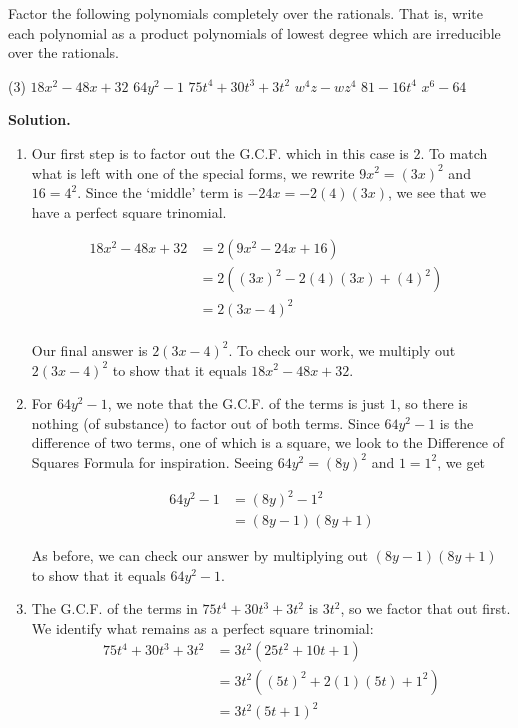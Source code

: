 \begin{ex}\label{FormulaFactoring}  Factor the following polynomials completely over the rationals.  That is, write each polynomial as a product polynomials of lowest degree which are irreducible over the rationals. 

\begin{tasks}(3)
\task  $18x^2 - 48x + 32$  
\task  $64y^2 - 1$ 
\task  $75t^4 + 30t^3 + 3t^2$
\task  $w^4 z - w z^4$
\task  \label{quadinform1} $81 - 16t^4$ 
\task  \label{quadinform2} $x^6 - 64$
\end{tasks}

{\bf Solution.}

\begin{enumerate}
\item  Our first step is to factor out the G.C.F. which in this case is $2$.  To match what is left with one of the special forms, we rewrite $9x^2 = (3x)^2$ and $16 = 4^2$. Since the `middle' term is $-24x = -2(4)(3x)$, we see that we have a perfect square trinomial.

\begin{align*}
18x^2 - 48x + 32 & = 2(9x^2 - 24x + 16) \tag{Factor out G.C.F.}\\
& = 2((3x)^2 - 2(4)(3x) + (4)^2) & \\
& = 2(3x-4)^2 \tag{Perfect Square Trinomial:  $a = 3x$, $b=4$} \\
\end{align*}

Our final answer is $2(3x-4)^2$.  To check our work, we multiply out $2(3x-4)^2$ to show that it equals $18x^2 - 48x + 32$.
 
\item  For $64y^2 - 1$, we note that the G.C.F. of the terms is just $1$, so there is nothing (of substance) to factor out of both terms. Since $64y^2 - 1$ is the difference of two terms, one of which is a square, we look to the Difference of Squares Formula for inspiration.   Seeing $64y^2 = (8y)^2$ and $1 = 1^2$, we get

\begin{align*}
64y^2 - 1 & = (8y)^2 - 1^2 \\
& = (8y-1)(8y+1) \tag{Difference of Squares, $a = 8y$, $b = 1$}
\end{align*}

As before, we can check our answer by multiplying out $(8y-1)(8y+1)$ to show that it equals $64y^2 - 1$.

\item  The G.C.F. of the terms in $75t^4 + 30t^3 + 3t^2$ is $3t^2$, so we factor that out first.  We identify what remains as a perfect square trinomial:
\begin{align*}
75t^4 + 30t^3 + 3t^2 & = 3t^2 (25t^2+10t + 1) \tag{Factor out G.C.F.}\\
& = 3t^2 ((5t)^2 + 2(1)(5t) + 1^2) \\
& = 3t^2 (5t+1)^2 \tag{Perfect Square Trinomial, $a = 5t$, $b = 1$} \\
\end{align*}


\end{enumerate}
\end{ex}
